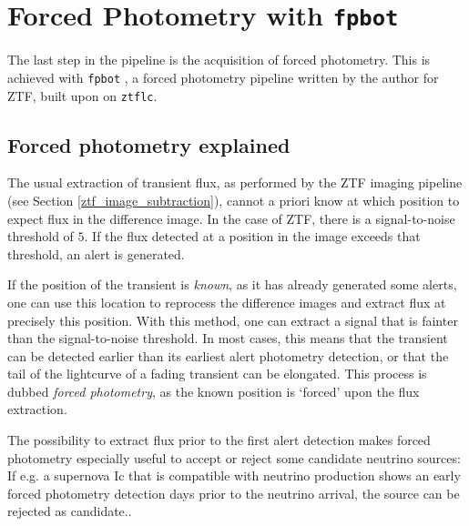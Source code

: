 \documentclass[
    a4paper, %
    fontsize=10pt, %
    twoside=true, %
    numbers=noenddot, %
    fontmethod=tex,
]{kaobook}
\begin{document}
\section{Forced Photometry with \texttt{fpbot}} \label{fpbot}
The last step in the pipeline is the acquisition of forced photometry. This is achieved with \texttt{fpbot} , a forced photometry pipeline written by the author for ZTF, built upon on \texttt{ztflc}.

\subsection{Forced photometry explained}
The usual extraction of transient flux, as performed by the ZTF imaging pipeline (see Section \ref{ztf_image_subtraction}), cannot a priori know at which position to expect flux in the difference image. In the case of ZTF, there is a signal-to-noise threshold of $5$. If the flux detected at a position in the image exceeds that threshold, an alert is generated.

If the position of the transient is \textit{known}, as it has already generated some alerts, one can use this location to reprocess the difference images and extract flux at precisely this position. With this method, one can extract a signal that is fainter than the signal-to-noise threshold. In most cases, this means that the transient can be detected earlier than its earliest alert photometry detection, or that the tail of the lightcurve of a fading transient can be elongated. This process is dubbed \textit{forced photometry}, as the known position is `forced' upon the flux extraction.

The possibility to extract flux prior to the first alert detection makes forced photometry especially useful to accept or reject some candidate neutrino sources: If e.g. a supernova Ic that is compatible with neutrino production shows an early forced photometry detection days prior to the neutrino arrival, the source can be rejected as candidate..
\end{document}

